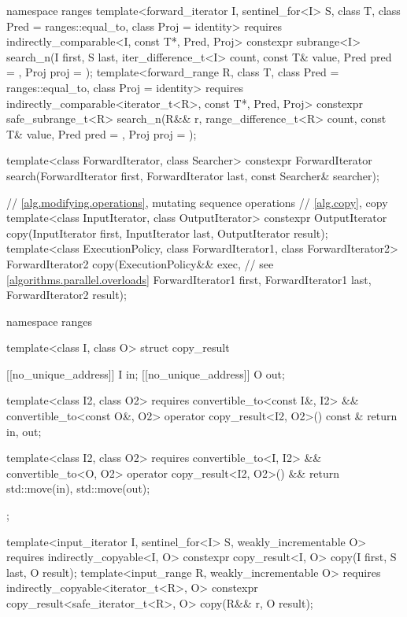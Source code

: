 \begin{codeblock}
{  namespace ranges {
    template<forward_iterator I, sentinel_for<I> S, class T,
             class Pred = ranges::equal_to, class Proj = identity>
      requires indirectly_comparable<I, const T*, Pred, Proj>
      constexpr subrange<I>
        search_n(I first, S last, iter_difference_t<I> count,
                 const T& value, Pred pred = {}, Proj proj = {});
    template<forward_range R, class T, class Pred = ranges::equal_to,
             class Proj = identity>
      requires indirectly_comparable<iterator_t<R>, const T*, Pred, Proj>
      constexpr safe_subrange_t<R>
        search_n(R&& r, range_difference_t<R> count,
                 const T& value, Pred pred = {}, Proj proj = {});
  }

  template<class ForwardIterator, class Searcher>
    constexpr ForwardIterator
      search(ForwardIterator first, ForwardIterator last, const Searcher& searcher);

  // \ref{alg.modifying.operations}, mutating sequence operations
  // \ref{alg.copy}, copy
  template<class InputIterator, class OutputIterator>
    constexpr OutputIterator copy(InputIterator first, InputIterator last,
                                  OutputIterator result);
  template<class ExecutionPolicy, class ForwardIterator1, class ForwardIterator2>
    ForwardIterator2 copy(ExecutionPolicy&& exec,               // see \ref{algorithms.parallel.overloads}
                          ForwardIterator1 first, ForwardIterator1 last,
                          ForwardIterator2 result);

  namespace ranges {
    template<class I, class O>
    struct copy_result {
      [[no_unique_address]] I in;
      [[no_unique_address]] O out;

      template<class I2, class O2>
        requires convertible_to<const I&, I2> && convertible_to<const O&, O2>
        operator copy_result<I2, O2>() const & {
          return {in, out};
        }

      template<class I2, class O2>
        requires convertible_to<I, I2> && convertible_to<O, O2>
        operator copy_result<I2, O2>() && {
          return {std::move(in), std::move(out)};
        }
    };

    template<input_iterator I, sentinel_for<I> S, weakly_incrementable O>
      requires indirectly_copyable<I, O>
      constexpr copy_result<I, O>
        copy(I first, S last, O result);
    template<input_range R, weakly_incrementable O>
      requires indirectly_copyable<iterator_t<R>, O>
      constexpr copy_result<safe_iterator_t<R>, O>
        copy(R&& r, O result);
  }

}
\end{codeblock}
